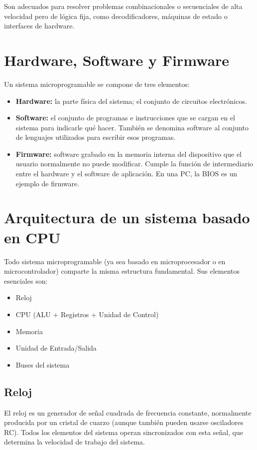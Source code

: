 Son adecuados para resolver problemas combinacionales o secuenciales de alta velocidad pero de lógica fija, como decodificadores, máquinas de estado o interfaces de hardware.

\section{Hardware, Software y Firmware}

Un sistema microprogramable se compone de tres elementos:

\begin{itemize}
  \item \textbf{Hardware:} la parte física del sistema; el conjunto de circuitos electrónicos.
  \item \textbf{Software:} el conjunto de programas e instrucciones que se cargan en el sistema para indicarle qué hacer. También se denomina software al conjunto de lenguajes utilizados para escribir esos programas.
  \item \textbf{Firmware:} software grabado en la memoria interna del dispositivo que el usuario normalmente no puede modificar. Cumple la función de intermediario entre el hardware y el software de aplicación. En una PC, la BIOS es un ejemplo de firmware.
\end{itemize}

\section{Arquitectura de un sistema basado en CPU}

Todo sistema microprogramable (ya sea basado en microprocesador o en microcontrolador) comparte la misma estructura fundamental. Sus elementos esenciales son:

\begin{itemize}
  \item Reloj
  \item CPU (ALU + Registros + Unidad de Control)
  \item Memoria
  \item Unidad de Entrada/Salida
  \item Buses del sistema
\end{itemize}

\subsection{Reloj}

El reloj es un generador de señal cuadrada de frecuencia constante, normalmente producida por un cristal de cuarzo (aunque también pueden usarse osciladores RC). Todos los elementos del sistema operan sincronizados con esta señal, que determina la velocidad de trabajo del sistema.

